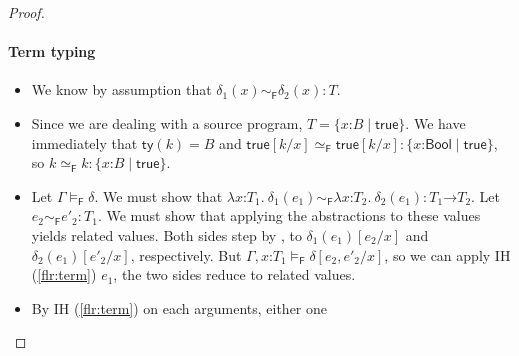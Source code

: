\documentclass[9pt]{extarticle}
\newcommand{\ottnt}[1]{\mathit{#1}}
\newcommand{\ottsym}[1]{#1}
\begin{document}
{\begin{lemma}
\begin{proof}
{    \paragraph{Term typing \fbox{$ \Gamma   \vdash _{  \mathsf{C}  }  \ottnt{e}  :  \ottnt{T} $}}
    \begin{itemize}
    \item[\T{Var}] We know by assumption that $ \delta_{{\mathrm{1}}}  \ottsym{(}  \mathit{x}  \ottsym{)}   \sim _{  \mathsf{F}  }  \delta_{{\mathrm{2}}}  \ottsym{(}  \mathit{x}  \ottsym{)}  :  \ottnt{T} $.
    \item[\T{Const}] Since we are dealing with a source program, $\ottnt{T}  \ottsym{=}   \{ \mathit{x} \mathord{:} \ottnt{B} \mathrel{\mid}  \mathsf{true}  \} $. We have immediately that $ \mathsf{ty} ( \ottnt{k} )   \ottsym{=}  \ottnt{B}$ and
      $   \mathsf{true}   [  \ottnt{k} / \mathit{x}  ]    \simeq _{  \mathsf{F}  }    \mathsf{true}   [  \ottnt{k} / \mathit{x}  ]   :   \{ \mathit{x} \mathord{:}  \mathsf{Bool}  \mathrel{\mid}  \mathsf{true}  \}  $, so $ \ottnt{k}   \simeq _{  \mathsf{F}  }  \ottnt{k}  :   \{ \mathit{x} \mathord{:} \ottnt{B} \mathrel{\mid}  \mathsf{true}  \}  $.
    \item[\T{Abs}] Let $ \Gamma   \models _{  \mathsf{F}  }  \delta $. We must show that
      $  \lambda \mathit{x} \mathord{:} \ottnt{T_{{\mathrm{1}}}} .~  \delta_{{\mathrm{1}}}  \ottsym{(}  \ottnt{e_{{\mathrm{1}}}}  \ottsym{)}    \sim _{  \mathsf{F}  }   \lambda \mathit{x} \mathord{:} \ottnt{T_{{\mathrm{2}}}} .~  \delta_{{\mathrm{2}}}  \ottsym{(}  \ottnt{e_{{\mathrm{1}}}}  \ottsym{)}   :   \ottnt{T_{{\mathrm{1}}}} \mathord{ \rightarrow } \ottnt{T_{{\mathrm{2}}}}  $. Let $ \ottnt{e_{{\mathrm{2}}}}   \sim _{  \mathsf{F}  }  \ottnt{e'_{{\mathrm{2}}}}  :  \ottnt{T_{{\mathrm{1}}}} $. We must show that applying the abstractions to
      these values yields related values. Both sides step by ,
      to $ \delta_{{\mathrm{1}}}  \ottsym{(}  \ottnt{e_{{\mathrm{1}}}}  \ottsym{)}  [  \ottnt{e_{{\mathrm{2}}}} / \mathit{x}  ] $ and $ \delta_{{\mathrm{2}}}  \ottsym{(}  \ottnt{e_{{\mathrm{1}}}}  \ottsym{)}  [  \ottnt{e'_{{\mathrm{2}}}} / \mathit{x}  ] $,
      respectively. But $  \Gamma , \mathit{x} \mathord{:} \ottnt{T_{{\mathrm{1}}}}    \models _{  \mathsf{F}  }   \delta  [  \ottnt{e_{{\mathrm{2}}}} , \ottnt{e'_{{\mathrm{2}}}} / \mathit{x}  ]  $, so we can
      apply IH (\ref{flr:term}) $\ottnt{e_{{\mathrm{1}}}}$, the two sides reduce to related
      values.
    \item[\T{Op}] By IH (\ref{flr:term}) on each arguments, either one

\end{itemize}}
\end{proof}
\end{lemma}}
\end{document}
